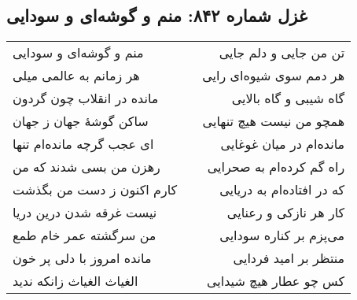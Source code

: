 \begin{center}
\section*{غزل شماره ۸۴۲: منم و گوشه‌ای و سودایی}
\label{sec:842}
\begin{longtable}{l p{0.5cm} r}
منم و گوشه‌ای و سودایی
&&
تن من جایی و دلم جایی
\\
هر زمانم به عالمی میلی
&&
هر دمم سوی شیوه‌ای رایی
\\
مانده در انقلاب چون گردون
&&
گاه شیبی و گاه بالایی
\\
ساکن گوشهٔ جهان ز جهان
&&
همچو من نیست هیچ تنهایی
\\
ای عجب گرچه مانده‌ام تنها
&&
مانده‌ام در میان غوغایی
\\
رهزن من بسی شدند که من
&&
راه گم کرده‌ام به صحرایی
\\
کارم اکنون ز دست من بگذشت
&&
که در افتاده‌ام به دریایی
\\
نیست غرقه شدن درین دریا
&&
کار هر نازکی و رعنایی
\\
من سرگشته عمر خام طمع
&&
می‌پزم بر کناره سودایی
\\
مانده امروز با دلی پر خون
&&
منتظر بر امید فردایی
\\
الغیاث الغیاث زانکه ندید
&&
کس چو عطار هیچ شیدایی
\\
\end{longtable}
\end{center}
